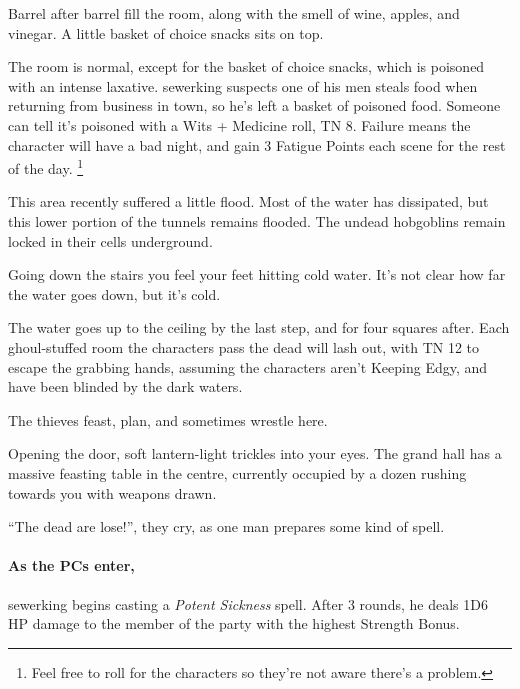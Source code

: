 \begin{multicols}{2}
\begin{boxtext}
  Barrel after barrel fill the room, along with the smell of wine, apples, and vinegar.  A little basket of choice snacks sits on top.

\end{boxtext}

The room is normal, except for the basket of choice snacks, which is poisoned with an intense laxative.
\Gls{sewerking} suspects one of his men steals food when returning from business in \gls{town}, so he's left a basket of poisoned food.
Someone can tell it's poisoned with a Wits + Medicine roll, TN 8.
Failure means the character will have a bad night, and gain 3 Fatigue Points each scene for the rest of the day.%
\footnote{Feel free to roll for the characters so they're not aware there's a problem.}


This area recently suffered a little flood.  Most of the water has dissipated, but this lower portion of the tunnels remains flooded.  The undead hobgoblins remain locked in their cells underground.


\begin{boxtext}
  Going down the stairs you feel your feet hitting cold water.  It's not clear how far the water goes down, but it's cold.
\end{boxtext}

The water goes up to the ceiling by the last step, and for four squares after.  Each ghoul-stuffed room the characters pass the dead will lash out, with TN 12 to escape the grabbing hands, assuming the characters aren't Keeping Edgy, and have been blinded by the dark waters.


The thieves feast, plan, and sometimes wrestle here.

\begin{boxtext}
  Opening the door, soft lantern-light trickles into your eyes.
  The grand hall has a massive feasting table in the centre, currently occupied by a dozen rushing towards you with weapons drawn.

  ``The dead are lose!'', they cry, as one man prepares some kind of spell.
\end{boxtext}

\paragraph{As the PCs enter,}
\gls{sewerking} begins casting a \textit{Potent Sickness} spell.
After 3 rounds, he deals 1D6 HP damage to the member of the party with the highest Strength Bonus.


\end{multicols}
